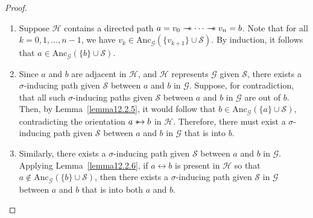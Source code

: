 \documentclass[accepted]{uai2025} %
\newcommand{\anc}{\text{Anc}}
\newcommand{\huh}{\mathrel{\leftrightarrow}}
\newcommand{\suh}{\mathrel{{\ast\mkern-11mu\to}}}
\newcommand{\tus}{\mathrel{{\relbar\mkern-11mu\relbar\mkern-11mu\ast}}}
\begin{document}
\lemmazero*
\begin{proof}
\begin{enumerate}
    \item Suppose \( \mathcal{H} \) contains a directed path \( a = v_0 \tus \cdots \tus v_n = b \). Note that for all \( k = 0, 1, \ldots, n-1 \), we have \( v_k \in \anc_{\mathcal{G}}(\{v_{k+1}\} \cup \mathcal{S}) \). By induction, it follows that \( a \in \anc_{\mathcal{G}}(\{b\} \cup \mathcal{S}) \).
    \item Since \( a \) and \( b \) are adjacent in \( \mathcal{H} \), and \( \mathcal{H} \) represents \( \mathcal{G} \) given \( \mathcal{S} \), there exists a \( \sigma \)-inducing path given \( \mathcal{S} \) between \( a \) and \( b \) in \( \mathcal{G} \). Suppose, for contradiction, that all such \( \sigma \)-inducing paths given \( \mathcal{S} \) between \( a \) and \( b \) in \( \mathcal{G} \) are out of \( b \). Then, by Lemma~\ref{lemma12.2.5}, it would follow that \( b \in \anc_{\mathcal{G}}(\{a\} \cup \mathcal{S}) \), contradicting the orientation \( a \suh b \) in \( \mathcal{H} \). Therefore, there must exist a \( \sigma \)-inducing path given \( \mathcal{S} \) between \( a \) and \( b \) in \( \mathcal{G} \) that is into \( b \).
    \item Similarly, there exists a \( \sigma \)-inducing path given \( \mathcal{S} \) between \( a \) and \( b \) in \( \mathcal{G} \). Applying Lemma~\ref{lemma12.2.6}, if \( a \huh b \) is present in \( \mathcal{H} \) so that $a\notin \anc_\mathcal{G}(\{b\}\cup \mathcal{S})$, then there exists a \( \sigma \)-inducing path given \( \mathcal{S} \) in \( \mathcal{G} \) between \( a \) and \( b \) that is into both \( a \) and \( b \).
\end{enumerate}
\end{proof}
\end{document}
